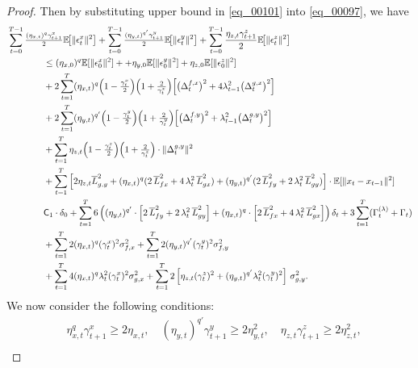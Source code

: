 \documentclass{uai2026} %
\newcommand{\EE}{\mathbb{E}}
\begin{document}
\begin{proof}
Then by substituting upper bound in \eqref{eq_00101} into \eqref{eq_00097}, we have
\begin{align}
    \MoveEqLeft[4]\sum_{t=0}^{T-1}\tfrac{(\eta_{x,t})^{q}\gamma_{t+1}^x}{2}\EE\!\big[\|\epsilon_t^x\|^2\big]+\sum_{t=0}^{T-1}\tfrac{(\eta_{y,t})^{q'}\gamma_{t+1}^y}{2}\EE\!\big[\|\epsilon_t^y\|^2\big]+\sum_{t=0}^{T-1}\frac{\eta_{z,t}\gamma_{t+1}^{z}}{2}\EE\!\big[\|\epsilon_t^z\|^2\big]\nonumber\\
 &\le (\eta_{x,0})^{q}\mathbb{E}[\|\epsilon_{0}^{x}\|^{2}]++\eta_{y,0}\mathbb{E}[\|\epsilon_{0}^y\|^2]+\eta_{z,0}\mathbb{E}[\|\epsilon_{0}^z\|^2]\nonumber\\
 &
+ 2\sum_{t=1}^{T}(\eta_{x,t})^{q}\Big(1-\tfrac{\gamma_t^x}{2}\Big)\Big(1+\tfrac{2}{\gamma_t^x}\Big)\!\left[
\big(\Delta_t^{f,x}\big)^2+4\lambda_{t-1}^2\big(\Delta_t^{g,x}\big)^2\right]\notag\\
&+ 2\sum_{t=1}^{T}(\eta_{y,t})^{q'}\Big(1-\tfrac{\gamma_t^y}{2}\Big)\Big(1+\tfrac{2}{\gamma_t^y}\Big)\!\left[
\big(\Delta_t^{f,y}\big)^2+\lambda_{t-1}^2\big(\Delta_t^{g,y}\big)^2\right]\notag\\
&+ \sum_{t=1}^{T}\eta_{z,t}\Big(1-\tfrac{\gamma_t^z}{2}\Big)\Big(1+\tfrac{2}{\gamma_t^z}\Big)\cdot\|\Delta_{t}^{g,y}\|^{2}\nonumber\\
&+ \sum_{t=1}^{T}\left[2\eta_{z,t}\overline L_{g,y}^2+(\eta_{x,t})^{q}(2\,\overline L_{fx}^2+4\,\lambda_t^2\,\overline L_{gx}^2)+(\eta_{y,t})^{q'}(2\,\overline L_{fy}^2+ 2\,\lambda_t^2\,\overline L_{gy}^2)\right]\cdot\mathbb{E}[\|x_t-x_{t-1}\|^2]\nonumber\\
&\mathsf{C}_{1}\cdot \delta_{0}+\sum_{t=1}^{T} 6\left((\eta_{y,t})^{q'}\cdot\left[2\,\overline L_{fy}^2+ 2\,\lambda_t^2\,\overline L_{gy}^2\right]+(\eta_{x,t})^{q}\cdot\left[2\,\overline L_{fx}^2+4\,\lambda_t^2\,\overline L_{gx}^2\right]\right)\delta_{t}+3\sum_{t=1}^{T}(\Gamma_{t}^{(\lambda)}+\Gamma_{t})\nonumber\\
&+\sum_{t=1}^{T}2(\eta_{x,t})^{q}(\gamma_t^x)^2\sigma_{f,x}^2+\sum_{t=1}^{T}2(\eta_{y,t})^{q'}(\gamma_t^y)^2\sigma_{f,y}^2\nonumber\\
&+\sum_{t=1}^{T}4(\eta_{x,t})^{q}\lambda_t^2(\gamma_t^x)^2\sigma_{g,x}^2+ \sum_{t=1}^{T}2\left[\eta_{z,t}(\gamma_t^z)^2+(\eta_{y,t})^{q'}\lambda_t^2(\gamma_t^y)^2\right]\,\sigma_{g,y}^2.\label{eq_00102}
\end{align}
We now consider the following conditions:
\begin{align}
    &\eta_{x,t}^{q}\gamma_{t+1}^{x}\ge 2\eta_{x,t},\quad (\eta_{y,t})^{q'}\gamma_{t+1}^{y}\ge 2\eta_{y,t}^{2},\quad \eta_{z,t}\gamma_{t+1}^{z}\ge 2\eta_{z,t}^{2},\label{eq_cond_etas}\\

\end{align}
\end{proof}
\end{document}
